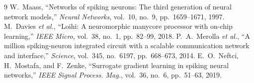 \documentclass[11pt,a4paper]{article}
\begin{document}
\begin{thebibliography}{9}
 W.~Maass, ``Networks of spiking neurons: The third generation of neural network models,'' \textit{Neural Networks}, vol.~10, no.~9, pp.~1659--1671, 1997.
 M.~Davies \textit{et al.}, ``Loihi: A neuromorphic manycore processor with on-chip learning,'' \textit{IEEE Micro}, vol.~38, no.~1, pp.~82--99, 2018.
 P.~A.~Merolla \textit{et al.}, ``A million spiking-neuron integrated circuit with a scalable communication network and interface,'' \textit{Science}, vol.~345, no.~6197, pp.~668--673, 2014.
 E.~O.~Neftci, H.~Mostafa, and F.~Zenke, ``Surrogate gradient learning in spiking neural networks,'' \textit{IEEE Signal Process. Mag.}, vol.~36, no.~6, pp.~51--63, 2019.
\end{thebibliography}
\end{document}
